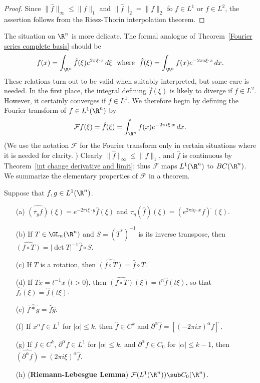 \begin{proof}
Since $\|\hat{f}\|_{\infty}\leq\|f\|_1$ and $\|\hat{f}\|_2=\|f\|_2$ fo $f\in L^1$ or $f\in L^2$, the assertion follows from the Riesz-Thorin interpolation theorem.
\end{proof}
The situation on $\R^n$ is more delicate. The formal analogue of Theorem~\ref{Fourier series complete basis} should be
\[f(x)=\int_{\R^n}\hat{f}(\xi)e^{2\pi\xi\cdot x}\,d\xi\ \ \text{where}\ \ \hat{f}(\xi)=\int_{\R^n}f(x)e^{-2\pi i\xi\cdot x}\,dx.\]
These relations turn out to be valid when suitably interpreted, but some care is needed. In the first place, the integral defining $\hat{f}(\xi)$ is likely to diverge if $f\in L^2$. However, it certainly converges if $f\in L^1$. We therefore begin by defining the Fourier transform of $f\in L^1(\R^n)$ by
\[\mathcal{F}f(\xi)=\hat{f}(\xi)=\int_{\R^n}f(x)e^{-2\pi i\xi\cdot x}\,dx.\]
(We use the notation $\mathcal{F}$ for the Fourier transform only in certain situations where it is needed for clarity. ) Clearly $\|\hat{f}\|_{\infty}\leq\|f\|_1$, and $\hat{f}$ is continuous by Theorem~\ref{int change derivative and limit}; thus $\mathcal{F}$ maps $L^1(\R^n)$ to $BC(\R^n)$. We summarize the elementary properties of $\mathcal{F}$ in a theorem.
\begin{theorem}\label{Fourier transform prop}
Suppose that $f,g\in L^1(\R^n)$.
\begin{itemize}
\item[(a)] $\widehat{(\tau_yf)}(\xi)=e^{-2\pi i\xi\cdot y}\hat{f}(\xi)$ and $\tau_\eta(\hat{f})(\xi)=(e^{2\pi i\eta\cdot x}f)^{\widehat{\ }}(\xi)$.
\item[(b)] If $T\in\GL_n(\R^n)$ and $S=(T^*)^{-1}$ is its inverse transpose, then $\widehat{(f\circ T)}=|\det T|^{-1}\hat{f}\circ S$.
\item[(c)] If $T$ is a rotation, then $\widehat{(f\circ T)}=\hat{f}\circ T$.
\item[(d)] If $Tx=t^{-1}x$ ($t>0$), then $\widehat{(f\circ T)}(\xi)=t^n\hat{f}(t\xi)$, so that $\widehat{f_t}(\xi)=\hat{f}(t\xi)$.
\item[(e)] $\widehat{f\ast g}=\hat{f}\hat{g}$.
\item[(f)] If $x^\alpha f\in L^1$ for $|\alpha|\leq k$, then $\hat{f}\in C^k$ and $\partial^\alpha\hat{f}=[(-2\pi ix)^\alpha f]^{\widehat{\ }}$.
\item[(g)] If $f\in C^k$, $\partial^\alpha f\in L^1$ for $|\alpha|\leq k$, and $\partial^\alpha f\in C_0$ for $|\alpha|\leq k-1$, then $\widehat{(\partial^\alpha f)}=(2\pi i\xi)^\alpha\hat{f}$.
\item[(h)] (\textbf{Riemann-Lebesgue Lemma}) $\mathcal{F}(L^1(\R^n))\sub C_0(\R^n)$.
\end{itemize}
\end{theorem}
